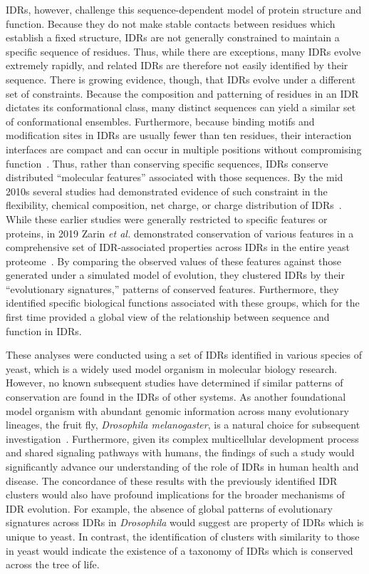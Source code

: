 IDRs, however, challenge this sequence-dependent model of protein structure and function. Because they do not make stable contacts between residues which establish a fixed structure, IDRs are not generally constrained to maintain a specific sequence of residues. Thus, while there are exceptions, many IDRs evolve extremely rapidly, and related IDRs are therefore not easily identified by their sequence. There is growing evidence, though, that IDRs evolve under a different set of constraints. Because the composition and patterning of residues in an IDR dictates its conformational class, many distinct sequences can yield a similar set of conformational ensembles. Furthermore, because binding motifs and modification sites in IDRs are usually fewer than ten residues, their interaction interfaces are compact and can occur in multiple positions without compromising function~\cite{Tompa2014}. Thus, rather than conserving specific sequences, IDRs conserve distributed ``molecular features'' associated with those sequences. By the mid 2010s several studies had demonstrated evidence of such constraint in the flexibility, chemical composition, net charge, or charge distribution of IDRs~\cite{Daughdrill2007, Moesa2012, Zarin2017, Beh2012}. While these earlier studies were generally restricted to specific features or proteins, in 2019 Zarin \textit{et al.} demonstrated conservation of various features in a comprehensive set of IDR-associated properties across IDRs in the entire yeast proteome~\cite{Zarin2019}. By comparing the observed values of these features against those generated under a simulated model of evolution, they clustered IDRs by their ``evolutionary signatures,''  patterns of conserved features. Furthermore, they identified specific biological functions associated with these groups, which for the first time provided a global view of the relationship between sequence and function in IDRs.

These analyses were conducted using a set of IDRs identified in various species of yeast, which is a widely used model organism in molecular biology research. However, no known subsequent studies have determined if similar patterns of conservation are found in the IDRs of other systems. As another foundational model organism with abundant genomic information across many evolutionary lineages, the fruit fly, \textit{Drosophila melanogaster}, is a natural choice for subsequent investigation~\cite{Yang2018, Miller2018, Kim2021}. Furthermore, given its complex multicellular development process and shared signaling pathways with humans, the findings of such a study would significantly advance our understanding of the role of IDRs in human health and disease. The concordance of these results with the previously identified IDR clusters would also have profound implications for the broader mechanisms of IDR evolution. For example, the absence of global patterns of evolutionary signatures across IDRs in \textit{Drosophila} would suggest are property of IDRs which is unique to yeast. In contrast, the identification of clusters with similarity to those in yeast would indicate the existence of a taxonomy of IDRs which is conserved across the tree of life.
